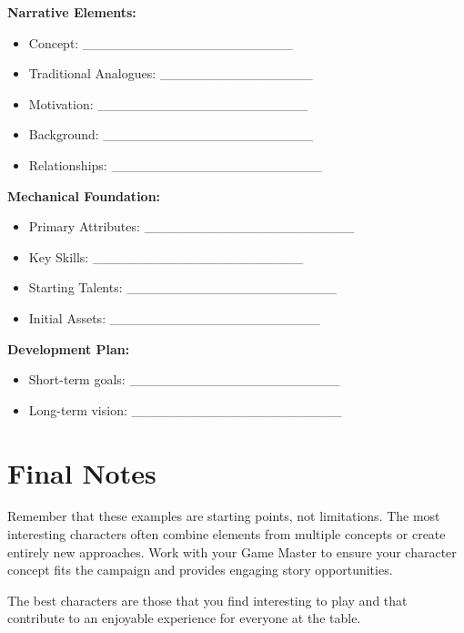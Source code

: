 \begin{tcolorbox}[colback=green!5!white,colframe=green!75!black,title=Character Concept Worksheet,fonttitle=\bfseries]
\textbf{Narrative Elements:}
\begin{itemize}
\item Concept: \_\_\_\_\_\_\_\_\_\_\_\_\_\_\_\_\_\_\_\_\_\_
\item Traditional Analogues: \_\_\_\_\_\_\_\_\_\_\_\_\_\_\_\_
\item Motivation: \_\_\_\_\_\_\_\_\_\_\_\_\_\_\_\_\_\_\_\_\_\_
\item Background: \_\_\_\_\_\_\_\_\_\_\_\_\_\_\_\_\_\_\_\_\_\_
\item Relationships: \_\_\_\_\_\_\_\_\_\_\_\_\_\_\_\_\_\_\_\_\_\_
\end{itemize}

\textbf{Mechanical Foundation:}
\begin{itemize}
\item Primary Attributes: \_\_\_\_\_\_\_\_\_\_\_\_\_\_\_\_\_\_\_\_\_\_
\item Key Skills: \_\_\_\_\_\_\_\_\_\_\_\_\_\_\_\_\_\_\_\_\_\_
\item Starting Talents: \_\_\_\_\_\_\_\_\_\_\_\_\_\_\_\_\_\_\_\_\_\_
\item Initial Assets: \_\_\_\_\_\_\_\_\_\_\_\_\_\_\_\_\_\_\_\_\_\_
\end{itemize}

\textbf{Development Plan:}
\begin{itemize}
\item Short-term goals: \_\_\_\_\_\_\_\_\_\_\_\_\_\_\_\_\_\_\_\_\_\_
\item Long-term vision: \_\_\_\_\_\_\_\_\_\_\_\_\_\_\_\_\_\_\_\_\_\_
\end{itemize}
\end{tcolorbox}

\section{Final Notes}
\label{sec:concepts-final}

Remember that these examples are starting points, not limitations. The most interesting characters often combine elements from multiple concepts or create entirely new approaches. Work with your Game Master to ensure your character concept fits the campaign and provides engaging story opportunities.

The best characters are those that you find interesting to play and that contribute to an enjoyable experience for everyone at the table.